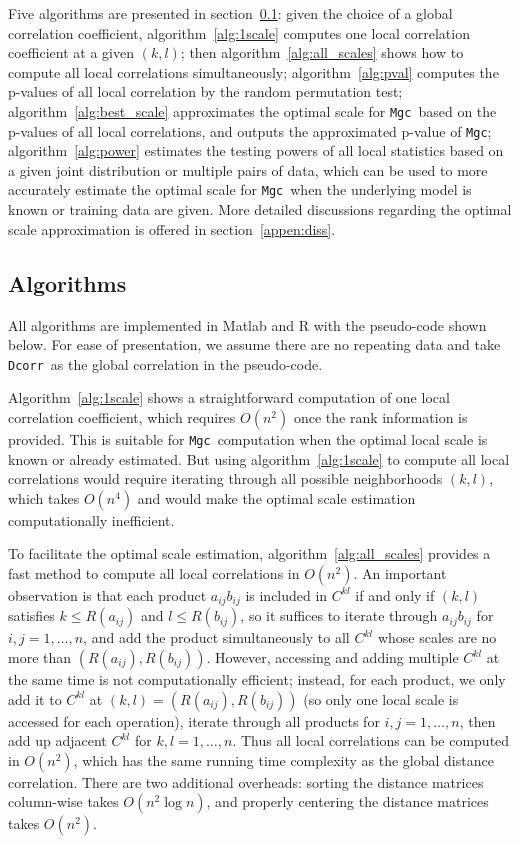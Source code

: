 \documentclass[11pt]{article}
\providecommand{\sct}[1]{{\sc \texttt{#1}}}
\newcommand{\G}{C}
\newcommand{\Mgc}{\sct{Mgc}}
\newcommand{\Dcorr}{\sct{Dcorr}}
\begin{document}
Five algorithms are presented in section~\ref{appen:algorithms}: given the choice of a global correlation coefficient, algorithm~\ref{alg:1scale} computes one local correlation coefficient at a given $(k,l)$; then algorithm~\ref{alg:all_scales} shows how to compute all local correlations simultaneously; algorithm~\ref{alg:pval} computes the p-values of all local correlation by the random permutation test; algorithm~\ref{alg:best_scale} approximates the optimal scale for \Mgc~based on the p-values of all local correlations, and outputs the approximated p-value of \Mgc; algorithm~\ref{alg:power} estimates the testing powers of all local statistics based on a given joint distribution or multiple pairs of data, which can be used to more accurately estimate the optimal scale for \Mgc~when the underlying model is known or training data are given. More detailed discussions regarding the optimal scale approximation is offered in section~\ref{appen:diss}.

\subsection{Algorithms}
\label{appen:algorithms}
All algorithms are implemented in Matlab and R with the pseudo-code shown below. For ease of presentation, we assume there are no repeating data and take \Dcorr~as the global correlation in the pseudo-code.

Algorithm~\ref{alg:1scale} shows a straightforward computation of one local correlation coefficient, which requires $O(n^2)$ once the rank information is provided. This is suitable for \Mgc~computation when the optimal local scale is known or already estimated. But using algorithm~\ref{alg:1scale} to compute all local correlations would require iterating through all possible neighborhoods $(k,l)$, which takes $O(n^4)$ and would make the optimal scale estimation computationally inefficient.

To facilitate the optimal scale estimation, algorithm~\ref{alg:all_scales} provides a fast method to compute all local correlations in $O(n^2)$. An important observation is that each product $a_{ij}b_{ij}$ is included in $\G^{kl}$ if and only if $(k,l)$ satisfies $k\leq R(a_{ij})$ and $l\leq R(b_{ij})$, so it suffices to iterate through $a_{ij}b_{ij}$ for $i,j=1,\ldots,n$, and add the product simultaneously to all $\G^{kl}$
whose scales are no more than $(R(a_{ij}),R(b_{ij}))$. However, accessing and adding multiple $\G^{kl}$ at the same time is not computationally efficient; instead, for each product, we only add it to $\G^{kl}$ at $(k,l)=(R(a_{ij}),R(b_{ij}))$ (so only one local scale is accessed for each operation), iterate through all products for $i,j=1,\ldots,n$, then add up adjacent $\G^{kl}$ for $k,l=1,\ldots,n$. Thus all local correlations can be computed in $O(n^2)$, which has the same running time complexity as the global distance correlation. There are two additional overheads: sorting the distance matrices column-wise takes $O(n^2 \log n)$, and properly centering the distance matrices takes $O(n^2)$.
\end{document}
